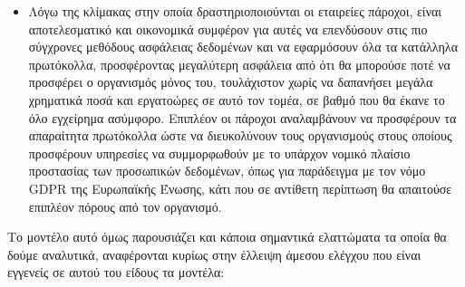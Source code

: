 \documentclass{article}
\begin{document}
\begin{itemize}
\item Λόγω της κλίμακας στην οποία δραστηριοποιούνται οι εταιρείες πάροχοι, είναι αποτελεσματικό και οικονομικά συμφέρον για αυτές να επενδύσουν στις πιο σύγχρονες μεθόδους ασφάλειας δεδομένων και να εφαρμόσουν όλα τα κατάλληλα πρωτόκολλα, προσφέροντας μεγαλύτερη ασφάλεια από ότι θα μπορούσε ποτέ να προσφέρει ο οργανισμός μόνος του, τουλάχιστον χωρίς να δαπανήσει μεγάλα χρηματικά ποσά και εργατοώρες σε αυτό τον τομέα, σε βαθμό που θα έκανε το όλο εγχείρημα ασύμφορο. Επιπλέον οι πάροχοι αναλαμβάνουν να προσφέρουν τα απαραίτητα πρωτόκολλα ώστε να διευκολύνουν τους οργανισμούς στους οποίους προσφέρουν υπηρεσίες να συμμορφωθούν με το υπάρχον νομικό πλαίσιο προστασίας των προσωπικών δεδομένων, όπως για παράδειγμα με τον νόμο GDPR της Ευρωπαϊκής Ένωσης, κάτι που σε αντίθετη περίπτωση θα απαιτούσε επιπλέον πόρους από τον οργανισμό.
\end{itemize}
Το μοντέλο αυτό όμως παρουσιάζει και κάποια σημαντικά ελαττώματα τα οποία θα δούμε αναλυτικά, αναφέρονται κυρίως στην έλλειψη άμεσου ελέγχου που είναι εγγενείς σε αυτού του είδους τα μοντέλα:
\end{document}
